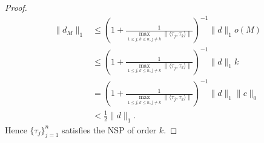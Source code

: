 \documentclass[10pt,a4paper]{amsart}
\begin{document}
\begin{proof}
\begin{align*}
\|d_M\|_1&\leq \left(1+\frac{1}{\displaystyle\max_{1\leq j, k \leq n, j\neq k}\|\langle \tau_j, \tau_k\rangle\|}\right)^{-1} \|d\|_1o(M)\\
&\leq\left(1+\frac{1}{\displaystyle\max_{1\leq j, k \leq n, j\neq k}\|\langle \tau_j, \tau_k\rangle\|}\right)^{-1} \|d\|_1k\\
&=\left(1+\frac{1}{\displaystyle\max_{1\leq j, k \leq n, j\neq k}\|\langle \tau_j, \tau_k\rangle\|}\right)^{-1} \|d\|_1\|c\|_0\\
&<\frac{1}{2}\|d\|_1.
\end{align*}
Hence 	$\{\tau_j\}_{j=1}^n $  satisfies the  NSP of order $k$.
\end{proof}
\end{document}
